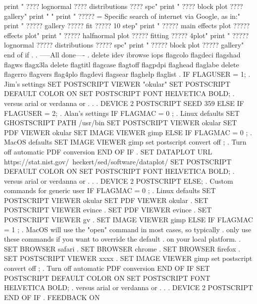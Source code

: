    print "          ???? lognormal   ???? distributions   ???? spc"
   print "          ???? block plot   ???? gallery"
   print " "
   print "  ????? = Specific search of internet via Google, as in:"
   print "          ????? gallery   ????? fit   ????? 10 step"
   print "          ????? main effects plot   ????? effects plot"
   print "          ????? halfnormal plot     ????? fitting   ????? 4plot"
   print "          ????? lognormal   ????? distributions   ????? spc"
   print "          ????? block plot   ????? gallery"
end of if
.
. -----All done----
.
delete idev ibrowse iops flagcolo flagdeci flagshad flagws flagx3la
delete flagtitl flagcase flagtoff flagpdpi flaghead flaglabe
delete flagerro flagvers flag4plo flagdevi flagsear flaghelp flaglist
.
IF FLAGUSER = 1; . Jim's settings
   SET POSTSCRIPT VIEWER "okular"
   SET POSTSCRIPT DEFAULT COLOR ON
   SET POSTSCRIPT FONT HELVETICA BOLD; . versus arial or verdanna or . . .
   DEVICE 2 POSTSCRIPT
   SEED 359
ELSE IF FLAGUSER = 2; . Alan's settings
   IF FLAGMAC = 0 ; . Linux defaults
      SET GHOSTSCRIPT PATH /usr/bin
      SET POSTSCRIPT VIEWER okular
      SET PDF VIEWER okular
      SET IMAGE VIEWER gimp
   ELSE IF FLAGMAC = 0 ; . MacOS defaults
      SET IMAGE VIEWER gimp
      set postscript convert off ; . Turn off automatic PDF conversion
   END OF IF
   . SET DATAPLOT URL https://stat.nist.gov/~heckert/sed/software/dataplot/
   SET POSTSCRIPT DEFAULT COLOR ON
   SET POSTSCRIPT FONT HELVETICA BOLD; . versus arial or verdanna or . . .
   DEVICE 2 POSTSCRIPT
ELSE; . Custom commands for generic user
   IF FLAGMAC = 0 ; . Linux defaults
      SET POSTSCRIPT VIEWER okular
      SET PDF VIEWER okular
      . SET POSTSCRIPT VIEWER evince
      . SET PDF VIEWER evince
      . SET POSTSCRIPT VIEWER gv
      . SET IMAGE VIEWER gimp
   ELSE IF FLAGMAC = 1 ;
      . MacOS will use the "open" command in most cases, so typically
      . only use these commands if you want to override the default
      . on your local platform.
      . SET BROWSER safari
      . SET BROWSER chrome
      . SET BROWSER firefox
      . SET POSTSCRIPT VIEWER xxxx
      . SET IMAGE VIEWER gimp
      set postscript convert off ; . Turn off automatic PDF conversion
   END OF IF
   SET POSTSCRIPT DEFAULT COLOR ON
   SET POSTSCRIPT FONT HELVETICA BOLD; . versus arial or verdanna or . . .
   DEVICE 2 POSTSCRIPT
END OF IF
.
FEEDBACK ON

